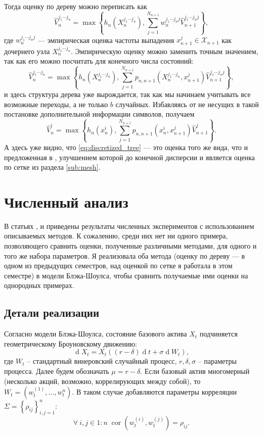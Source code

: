 \documentclass[specialist,
               substylefile = ../spbu.rtx,
               subf,href,colorlinks=true, 10pt]{disser}
\newcommand{\Vhat}{\hat{V}}
\newcommand{\maxset}[1]{\max\left\lbrace#1\right\rbrace}
\DeclareMathOperator{\correlation}{cor}
\newcommand{\corr}[2]{\correlation\left(#1, #2\right)}
\DeclareMathOperator{\dd}{d}
\begin{document}
Тогда оценку по дереву можно переписать как $$\Vhat_n^{j_1\cdots j_n} = \maxset{ h_n(X_n^{j_1\cdots j_n}), \sum_{j=1}^{N_{n+1}} w_n^{j_1\cdots j_n j}\hat V_{n+1}^{j_1\cdots j_n j}},$$
где $w_n^{j_1\cdots j_n j}$ --- эмпирическая оценка частоты выпадения $x_{n+1}^j \in \mathcal X_{n+1}$ как дочернего узла $X_n^{j_1 \cdots j_n}$. Эмпирическую оценку можно заменить точным значением, так как его можно посчитать для конечного числа состояний:
$$\Vhat_n^{j_1\cdots j_n} = \maxset{ h_n(X_n^{j_1\cdots j_n}), \sum_{j=1}^{N_{n+1}} p_{n, n+1}(X_n^{j_1\cdots j_n}, x_{n+1}^j) \hat V_{n+1}^{j_1\cdots j_n j}},$$
и здесь структура дерева уже вырождается, так как мы начинаем учитывать все возможные переходы, а не только $b$ случайных. Избавляясь от не несущих в такой постановке дополнительной информации символов, получаем
\begin{equation}
    \label{eq:discretized_tree}\Vhat_n^i = \maxset{ h_n(x_n^i), \sum_{j = 1}^{N_{n + 1}} p_{n, n+1}(x_n^i, x_{n+1}^j) \Vhat_{n+1}^j}.
\end{equation}А здесь уже видно, что \eqref{eq:discretized_tree} --- это оценка того же вида, что и предложенная в \cite{Broadie2004}, улучшением которой до конечной дисперсии и является оценка по сетке из раздела \ref{sub:mesh}.

\chapter{Численный анализ}

В статьях \cite{Broadie1997}, \cite{Broadie1997a} и \cite{Kashtanov2015} приведены результаты численных экспериментов с использованием описываемых методов. К сожалению, среди них нет ни одного примера, позволяющего сравнить оценки, полученные различными методами, для одного и того же набора параметров. Я реализовала оба метода (оценку по дереву --- в одном из предыдущих семестров, над оценкой по сетке я работала в этом семестре) в модели Блэка-Шоулса, чтобы сравнить получаемые ими оценки на однородных примерах.

\section{Детали реализации}

Согласно модели Блэка-Шоулса, состояние базового актива $X_t$ подчиняется геометрическому Броуновскому движению:
\begin{equation}\label{eq:black-scholes}
\dd X_t = X_t\left(\left(r - \delta\right)\dd t + \sigma \dd W_t\right),
\end{equation}
где $W_t$ -- стандартный винеровский случайный процесс, $r, \delta, \sigma$ -- параметры процесса. Далее будем обозначать $\mu = r - \delta$. Если базовый актив многомерный (несколько акций, возможно, коррелирующих между собой), то  $W_t = \left(w_t^{(1)}, \ldots, w_t^{{n}}\right)$. В таком случае добавляются параметры корреляции $\Sigma = \left\{\rho_{ij}\right\}_{i, j = 1}^n$:
$$\forall\: i, j \in 1 \mathbin : n \; \corr{w_t^{(i)}}{w_t^{(j)}} = \rho_{ij}.$$
\end{document}
